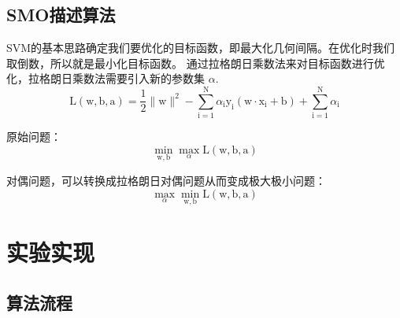 \documentclass[UTF8,a4paper,AutoFakeBold,AutoFakeSlant]{article}
\begin{document}
\subsection{SMO描述算法}

SVM的基本思路确定我们要优化的目标函数，即最大化几何间隔。在优化时我们取倒数，所以就是最小化目标函数。
通过拉格朗日乘数法来对目标函数进行优化，拉格朗日乘数法需要引入新的参数集 $\alpha$.
\begin{equation*}
  \mathrm{L}(\mathrm{w}, \mathrm{b}, \mathrm{a})=\frac{1}{2}\|\mathrm{w}\|^{2}-\sum_{\mathrm{i}=1}^{\mathrm{N}} \alpha_{\mathrm{i}} \mathrm{y}_{\mathrm{i}}\left(\mathrm{w} \cdot \mathrm{x}_{\mathrm{i}}+\mathrm{b}\right)+\sum_{\mathrm{i}=1}^{\mathrm{N}} \alpha_{\mathrm{i}}
\end{equation*}

原始问题：
\begin{equation*}
  \min _{\mathrm{w}, \mathrm{b}} \max _{\alpha} \mathrm{L}(\mathrm{w}, \mathrm{b}, \mathrm{a})
\end{equation*}

对偶问题，可以转换成拉格朗日对偶问题从而变成极大极小问题：
\begin{equation*}
  \max _{\alpha} \min _{\mathrm{w}, \mathrm{b}} \mathrm{L}(\mathrm{w}, \mathrm{b}, \mathrm{a})
\end{equation*}


\section{实验实现}

\subsection{算法流程}
\end{document}
